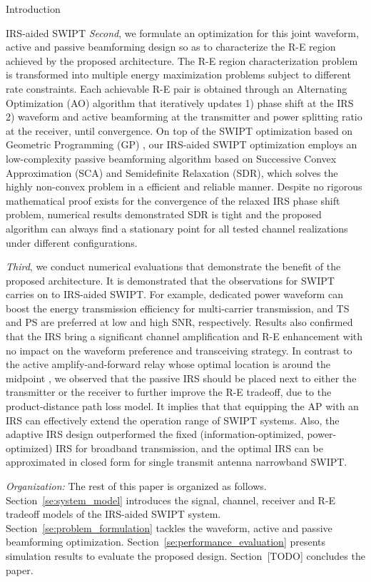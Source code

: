 \documentclass[journal]{IEEEtran}
\begin{document}
\begin{section}{Introduction}
\begin{subsection}{IRS-aided SWIPT}
			\textit{Second}, we formulate an optimization for this joint waveform, active and passive beamforming design so as to characterize the R-E region achieved by the proposed architecture. The R-E region characterization problem is transformed into multiple energy maximization problems subject to different rate constraints. Each achievable R-E pair is obtained through an Alternating Optimization (AO) algorithm that iteratively updates 1) phase shift at the IRS 2) waveform and active beamforming at the transmitter and power splitting ratio at the receiver, until convergence. On top of the SWIPT optimization based on Geometric Programming (GP) \cite{Clerckx2018b}, our IRS-aided SWIPT optimization employs an low-complexity passive beamforming algorithm based on Successive Convex Approximation (SCA) and Semidefinite Relaxation (SDR), which solves the highly non-convex problem in a efficient and reliable manner. Despite no rigorous mathematical proof exists for the convergence of the relaxed IRS phase shift problem, numerical results demonstrated SDR is tight and the proposed algorithm can always find a stationary point for all tested channel realizations under different configurations.

			\textit{Third}, we conduct numerical evaluations that demonstrate the benefit of the proposed architecture. It is demonstrated that the observations for SWIPT carries on to IRS-aided SWIPT. For example, dedicated power waveform can boost the energy transmission efficiency for multi-carrier transmission, and TS and PS are preferred at low and high SNR, respectively. Results also confirmed that the IRS bring a significant channel amplification and R-E enhancement with no impact on the waveform preference and transceiving strategy. In contrast to the active amplify-and-forward relay whose optimal location is around the midpoint \cite{Li2017}, we observed that the passive IRS should be placed next to either the transmitter or the receiver to further improve the R-E tradeoff, due to the product-distance path loss model. It implies that that equipping the AP with an IRS can effectively extend the operation range of SWIPT systems. Also, the adaptive IRS design outperformed the fixed (information-optimized, power-optimized) IRS for broadband transmission, and the optimal IRS can be approximated in closed form for single transmit antenna narrowband SWIPT.

			\textit{Organization:} The rest of this paper is organized as follows. Section~\ref{se:system_model} introduces the signal, channel, receiver and R-E tradeoff models of the IRS-aided SWIPT system. Section~\ref{se:problem_formulation} tackles the waveform, active and passive beamforming optimization. Section~\ref{se:performance_evaluation} presents simulation results to evaluate the proposed design. Section~[TODO] concludes the paper.


\end{subsection}
\end{section}
\end{document}
